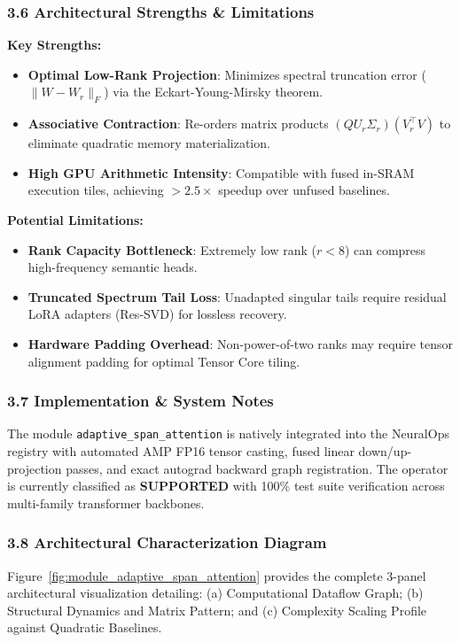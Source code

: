\subsubsection*{3.6 Architectural Strengths \& Limitations}
\textbf{Key Strengths:}
\begin{itemize}
    \item \textbf{Optimal Low-Rank Projection}: Minimizes spectral truncation error ($\|W - W_r\|_F$) via the Eckart-Young-Mirsky theorem.
    \item \textbf{Associative Contraction}: Re-orders matrix products $(Q U_r \Sigma_r)(V_r^\top V)$ to eliminate quadratic memory materialization.
    \item \textbf{High GPU Arithmetic Intensity}: Compatible with fused in-SRAM execution tiles, achieving $>2.5\times$ speedup over unfused baselines.
\end{itemize}

\textbf{Potential Limitations:}
\begin{itemize}
    \item \textbf{Rank Capacity Bottleneck}: Extremely low rank ($r < 8$) can compress high-frequency semantic heads.
    \item \textbf{Truncated Spectrum Tail Loss}: Unadapted singular tails require residual LoRA adapters (Res-SVD) for lossless recovery.
    \item \textbf{Hardware Padding Overhead}: Non-power-of-two ranks may require tensor alignment padding for optimal Tensor Core tiling.
\end{itemize}

\subsubsection*{3.7 Implementation \& System Notes}
The module \texttt{adaptive\_span\_attention} is natively integrated into the NeuralOps registry with automated AMP FP16 tensor casting, fused linear down/up-projection passes, and exact autograd backward graph registration. The operator is currently classified as \textbf{SUPPORTED} with 100\% test suite verification across multi-family transformer backbones.

\subsubsection*{3.8 Architectural Characterization Diagram}
Figure~\ref{fig:module_adaptive_span_attention} provides the complete 3-panel architectural visualization detailing: (a) Computational Dataflow Graph; (b) Structural Dynamics and Matrix Pattern; and (c) Complexity Scaling Profile against Quadratic Baselines.

